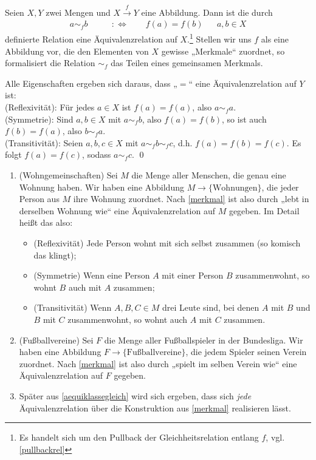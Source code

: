 \begin{bem} \label{merkmal}
    Seien $X,Y$ zwei Mengen und $X\xrightarrow{f} Y$ eine Abbildung. Dann ist die durch
    \begin{align*}
        a \sim_f b \qquad&:\Leftrightarrow\qquad f(a)=f(b) && a,b\in X
    \end{align*}
    definierte Relation eine Äquivalenzrelation auf $X$.\footnote{Es handelt sich um den Pullback der Gleichheitsrelation entlang $f$, vgl. \cref{pullbackrel}} Stellen wir uns $f$ als eine Abbildung vor, die den Elementen von $X$ gewisse „Merkmale“ zuordnet, so formalisiert die Relation $\sim_f$ das Teilen eines gemeinsamen Merkmals.
\end{bem}


\begin{bew}
    Alle Eigenschaften ergeben sich daraus, dass „$=$“ eine Äquivalenzrelation auf $Y$ ist: \\[0.5em]
    (Reflexivität): Für jedes $a\in X$ ist $f(a)=f(a)$, also $a\sim_f a$. \\[0.5em]
    (Symmetrie): Sind $a,b\in X$ mit $a\sim_f b$, also $f(a)=f(b)$, so ist auch $f(b)=f(a)$, also $b\sim_f a$. \\[0.5em]
    (Transitivität): Seien $a,b,c\in X$ mit $a\sim_f b\sim_f c$, d.h. $f(a)=f(b)=f(c)$. Es folgt  $f(a)=f(c)$, sodass $a\sim_f c$. \qed
\end{bew}


\begin{bsp} \quad
    \begin{enumerate}
        \item(Wohngemeinschaften) Sei $M$ die Menge aller Menschen, die genau eine Wohnung haben. Wir haben eine Abbildung $M\to \{\text{Wohnungen}\}$, die jeder Person aus $M$ ihre Wohnung zuordnet. Nach \cref{merkmal} ist also durch „lebt in derselben Wohnung wie“ eine Äquivalenzrelation auf $M$ gegeben. Im Detail heißt das also:
        \begin{itemize}
            \item(Reflexivität) Jede Person wohnt mit sich selbst zusammen (so komisch das klingt);
            \item(Symmetrie) Wenn eine Person $A$ mit einer Person $B$ zusammenwohnt, so wohnt $B$ auch mit $A$ zusammen;
            \item(Transitivität) Wenn $A,B,C\in M$ drei Leute sind, bei denen $A$ mit $B$ und $B$ mit $C$ zusammenwohnt, so wohnt auch $A$ mit $C$ zusammen.
        \end{itemize}
        \item(Fußballvereine) Sei $F$ die Menge aller Fußballspieler in der Bundesliga. Wir haben eine Abbildung $F\to\{\text{Fußballvereine}\}$, die jedem Spieler seinen Verein zuordnet. Nach \cref{merkmal} ist also durch „spielt im selben Verein wie“ eine Äquivalenzrelation auf $F$ gegeben.
        \item Später aus \cref{aequiklassegleich} wird sich ergeben, dass sich \emph{jede} Äquivalenzrelation über die Konstruktion aus \cref{merkmal} realisieren lässt.
    \end{enumerate}
\end{bsp}


